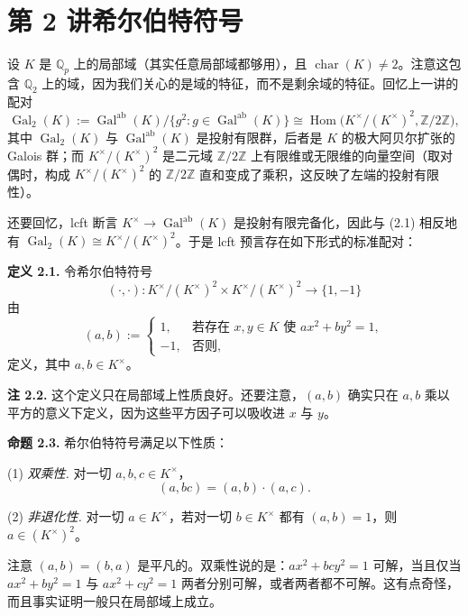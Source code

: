 
\section*{第 2 讲\quad 希尔伯特符号}

设 $K$ 是 $\mathbb{Q}_p$ 上的局部域（其实任意局部域都够用），且 $\operatorname{char}(K)\neq 2$。注意这包含 $\mathbb{Q}_2$ 上的域，因为我们关心的是域的特征，而不是剩余域的特征。回忆上一讲的配对
\begin{equation}\tag{2.1}
  \operatorname{Gal}_2(K):=\operatorname{Gal}^{\mathrm{ab}}(K)/\{g^2:g\in\operatorname{Gal}^{\mathrm{ab}}(K)\}
  \cong\operatorname{Hom}\big(K^{\times}/(K^{\times})^2,\mathbb{Z}/2\mathbb{Z}\big),
\end{equation}
其中 $\operatorname{Gal}_2(K)$ 与 $\operatorname{Gal}^{\mathrm{ab}}(K)$ 是投射有限群，后者是 $K$ 的极大阿贝尔扩张的 Galois 群；而 $K^{\times}/(K^{\times})^2$ 是二元域 $\mathbb{Z}/2\mathbb{Z}$ 上有限维或无限维的向量空间（取对偶时，构成 $K^{\times}/(K^{\times})^2$ 的 $\mathbb{Z}/2\mathbb{Z}$ 直和变成了乘积，这反映了左端的投射有限性）。

还要回忆，lcft 断言 $K^{\times}\to\operatorname{Gal}^{\mathrm{ab}}(K)$ 是投射有限完备化，因此与 (2.1) 相反地有 $\operatorname{Gal}_2(K)\cong K^{\times}/(K^{\times})^2$。于是 lcft 预言存在如下形式的标准配对：

\textbf{定义 2.1.} 令希尔伯特符号
\[
  (\cdot,\cdot)\colon K^{\times}/(K^{\times})^2\times K^{\times}/(K^{\times})^2\to\{1,-1\}
\]
由
\[
  (a,b):=
  \begin{cases}
    1, & \text{若存在 } x,y\in K \text{ 使 } ax^2+by^2=1,\\
    -1, & \text{否则},
  \end{cases}
\]
定义，其中 $a,b\in K^{\times}$。

\textbf{注 2.2.} 这个定义只在局部域上性质良好。还要注意，$(a,b)$ 确实只在 $a,b$ 乘以平方的意义下定义，因为这些平方因子可以吸收进 $x$ 与 $y$。

\textbf{命题 2.3.} 希尔伯特符号满足以下性质：

(1) \emph{双乘性.} 对一切 $a,b,c\in K^{\times}$，
\[
  (a,bc)=(a,b)\cdot(a,c).
\]

(2) \emph{非退化性.} 对一切 $a\in K^{\times}$，若对一切 $b\in K^{\times}$ 都有 $(a,b)=1$，则 $a\in(K^{\times})^2$。

注意 $(a,b)=(b,a)$ 是平凡的。双乘性说的是：$ax^2+bcy^2=1$ 可解，当且仅当 $ax^2+by^2=1$ 与 $ax^2+cy^2=1$ 两者分别可解，或者两者都不可解。这有点奇怪，而且事实证明一般只在局部域上成立。

